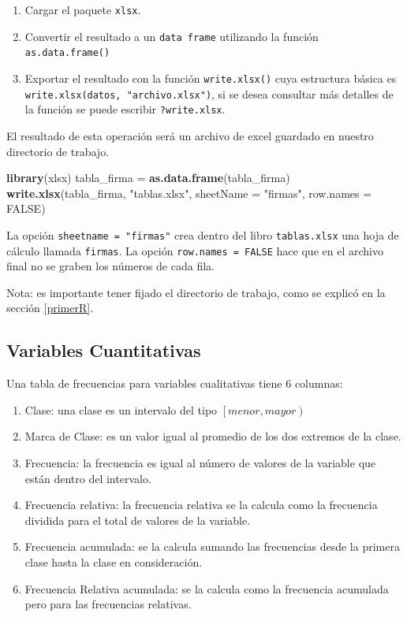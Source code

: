 \documentclass[]{book}
\newenvironment{Shaded}{\begin{snugshade}}{\end{snugshade}}
\newcommand{\KeywordTok}[1]{\textcolor[rgb]{0.13,0.29,0.53}{\textbf{#1}}}
\newcommand{\DataTypeTok}[1]{\textcolor[rgb]{0.13,0.29,0.53}{#1}}
\newcommand{\StringTok}[1]{\textcolor[rgb]{0.31,0.60,0.02}{#1}}
\newcommand{\OtherTok}[1]{\textcolor[rgb]{0.56,0.35,0.01}{#1}}
\newcommand{\NormalTok}[1]{#1}
\providecommand{\tightlist}{%
  \setlength{\itemsep}{0pt}\setlength{\parskip}{0pt}}
\begin{document}
\begin{enumerate}
\def\labelenumi{\arabic{enumi}.}
\tightlist
\item
  Cargar el paquete \texttt{xlsx}.
\item
  Convertir el resultado a un \texttt{data\ frame} utilizando la función
  \texttt{as.data.frame()}
\item
  Exportar el resultado con la función \texttt{write.xlsx()} cuya
  estructura básica es \texttt{write.xlsx(datos,\ "archivo.xlsx")}, si
  se desea consultar más detalles de la función se puede escribir
  \texttt{?write.xlsx}.
\end{enumerate}

El resultado de esta operación será un archivo de excel guardado en
nuestro directorio de trabajo.

\begin{Shaded}
\begin{Highlighting}[]
\KeywordTok{library}\NormalTok{(xlsx)}
\NormalTok{tabla_firma =}\StringTok{ }\KeywordTok{as.data.frame}\NormalTok{(tabla_firma)}
\KeywordTok{write.xlsx}\NormalTok{(tabla_firma, }\StringTok{"tablas.xlsx"}\NormalTok{, }\DataTypeTok{sheetName =} \StringTok{"firmas"}\NormalTok{, }\DataTypeTok{row.names =} \OtherTok{FALSE}\NormalTok{)}
\end{Highlighting}
\end{Shaded}

La opción \texttt{sheetname\ =\ "firmas"} crea dentro del libro
\texttt{tablas.xlsx} una hoja de cálculo llamada \texttt{firmas}. La
opción \texttt{row.names\ =\ FALSE} hace que en el archivo final no se
graben los números de cada fila.

Nota: es importante tener fijado el directorio de trabajo, como se
explicó en la sección \ref{primerR}.

\subsection{Variables Cuantitativas}\label{variables-cuantitativas}

Una tabla de frecuencias para variables cualitativas tiene 6 columnas:

\begin{enumerate}
\def\labelenumi{\arabic{enumi}.}
\tightlist
\item
  Clase: una clase es un intervalo del tipo
  \(\left[ menor, mayor \right)\)
\item
  Marca de Clase: es un valor igual al promedio de los dos extremos de
  la clase.
\item
  Frecuencia: la frecuencia es igual al número de valores de la variable
  que están dentro del intervalo.
\item
  Frecuencia relativa: la frecuencia relativa se la calcula como la
  frecuencia dividida para el total de valores de la variable.
\item
  Frecuencia acumulada: se la calcula sumando las frecuencias desde la
  primera clase hasta la clase en consideración.
\item
  Frecuencia Relativa acumulada: se la calcula como la frecuencia
  acumulada pero para las frecuencias relativas.
\end{enumerate}
\end{document}
